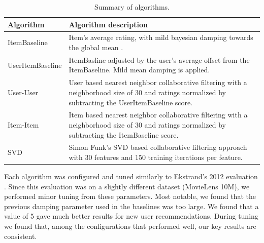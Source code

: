 \documentclass[letterpaper]{sig-alternate}
\begin{document}
  \begin{table}
    \centering
    \begin{tabular}{|p{6em}|p{18em}|}
      \hline
      Algorithm          & Algorithm description \\\hline
      ItemBaseline       & Item's average rating, with mild bayesian damping towards the global mean \cite{funk_netflix_2006}. \\\hline
      UserItem\-Baseline & ItemBasline adjusted by the user's average offset from the ItemBaseline. Mild mean damping is applied\cite{funk_netflix_2006}. \\\hline
      User-User          & User based nearest neighbor collaborative filtering \cite{resnick1994grouplens} with a neighborhood size of 30 and ratings normalized by subtracting the UserItemBaseline score. \\\hline
      Item-Item          & Item based nearest neighbor collaborative filtering \cite{sarwar2001item} with a neighborhood size of 30 and ratings normalized by subtracting the ItemBaseline score.   \\\hline
      SVD                & Simon Funk's SVD based collaborative filtering approach \cite{funk_netflix_2006} with 30 features and 150 training iterations per feature. \\\hline
    \end{tabular}
    \caption{Summary of algorithms.}
    \label{tbl:algo}
  \end{table}
  
  Each algorithm was configured and tuned similarly to Ekstrand's 2012 evaluation \cite{ekstrand2012recommenders}.
  Since this evaluation was on a slightly different dataset (MovieLens 10M), we performed minor tuning from these parameters.
  Most notable, we found that the previous damping parameter used in the baselines was too large.
  We found that a value of 5 gave much better results for new user recommendations.
  During tuning we found that, among the configurations that performed well, our key results are consistent.
\end{document}
